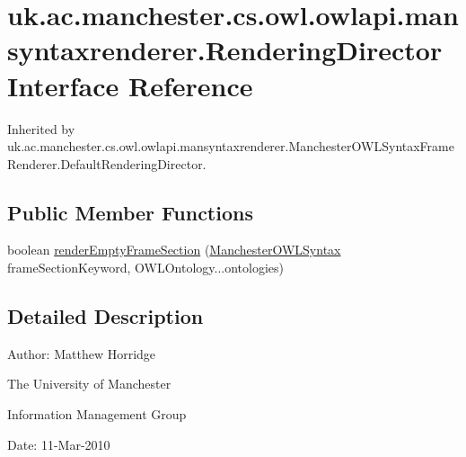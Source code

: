 \hypertarget{interfaceuk_1_1ac_1_1manchester_1_1cs_1_1owl_1_1owlapi_1_1mansyntaxrenderer_1_1_rendering_director}{\section{uk.\-ac.\-manchester.\-cs.\-owl.\-owlapi.\-mansyntaxrenderer.\-Rendering\-Director Interface Reference}
\label{interfaceuk_1_1ac_1_1manchester_1_1cs_1_1owl_1_1owlapi_1_1mansyntaxrenderer_1_1_rendering_director}
}


Inherited by uk.\-ac.\-manchester.\-cs.\-owl.\-owlapi.\-mansyntaxrenderer.\-Manchester\-O\-W\-L\-Syntax\-Frame\-Renderer.\-Default\-Rendering\-Director.

\subsection*{Public Member Functions}
\begin{DoxyCompactItemize}
\item 
boolean \hyperlink{interfaceuk_1_1ac_1_1manchester_1_1cs_1_1owl_1_1owlapi_1_1mansyntaxrenderer_1_1_rendering_director_ab7ab91cb688ab5c6573ab771836dbe49}{render\-Empty\-Frame\-Section} (\hyperlink{enumorg_1_1coode_1_1owlapi_1_1manchesterowlsyntax_1_1_manchester_o_w_l_syntax}{Manchester\-O\-W\-L\-Syntax} frame\-Section\-Keyword, O\-W\-L\-Ontology...\-ontologies)
\end{DoxyCompactItemize}


\subsection{Detailed Description}
Author\-: Matthew Horridge\par
 The University of Manchester\par
 Information Management Group\par
 Date\-: 11-\/\-Mar-\/2010 

